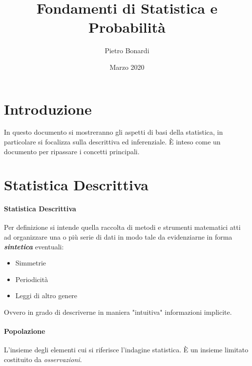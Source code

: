 \documentclass{article}
\title{\textbf{Fondamenti di Statistica e Probabilità}}
\author{Pietro Bonardi}
\date{Marzo 2020}
\begin{document}
\maketitle 
\tableofcontents
\newpage

\section{Introduzione}
In questo documento si mostreranno gli aspetti di basi della statistica, in particolare si focalizza sulla descrittiva ed inferenziale. È inteso come un documento per ripassare i concetti principali. 

\section{Statistica Descrittiva}
    \paragraph{Statistica Descrittiva}Per definizione si intende quella raccolta di metodi e strumenti matematici atti ad organizzare una o più serie di dati in modo tale da evidenziarne in forma \textbf{\textit{sintetica}} eventuali:
    \begin{itemize}
        \item Simmetrie
        \item Periodicità
        \item Leggi di altro genere
    \end{itemize}
        Ovvero in grado di descriverne in maniera "intuitiva" informazioni implicite. 
    
    
    \paragraph{Popolazione} L'insieme degli elementi cui si riferisce l'indagine statistica.
     È un insieme limitato costituito da \textit{osservazioni}.
\end{document}
